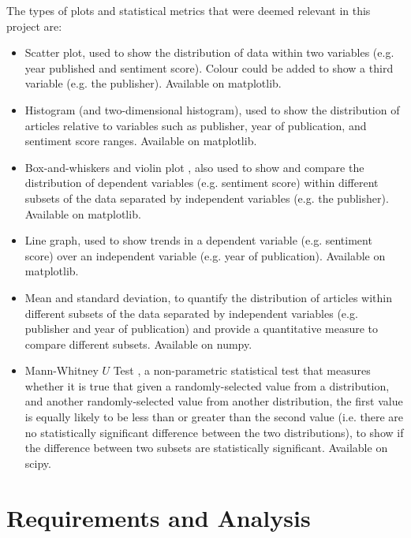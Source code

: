 \documentclass{report}
\begin{document}
The types of plots and statistical metrics that were deemed relevant in this project are:
\begin{itemize}
	\item Scatter plot, used to show the distribution of data within two variables (e.g. year published and sentiment score). 
		Colour could be added to show a third variable (e.g. the publisher).
		Available on matplotlib.
	\item Histogram (and two-dimensional histogram), used to show the distribution of articles relative to variables such as publisher, year of publication, and sentiment score ranges. 
		Available on matplotlib.
	\item Box-and-whiskers \cite{tukey1977exploratory} and violin plot \cite{hintze1998violin}, also used to show and compare the distribution of dependent variables (e.g. sentiment score) within different subsets of the data separated by independent variables (e.g. the publisher).
		Available on matplotlib.
	\item Line graph, used to show trends in a dependent variable (e.g. sentiment score) over an independent variable (e.g. year of publication).
		Available on matplotlib.
	\item Mean and standard deviation, to quantify the distribution of articles within different subsets of the data separated by independent variables (e.g. publisher and year of publication) and provide a quantitative measure to compare different subsets.
		Available on numpy.
	\item Mann-Whitney $U$ Test \cite{mann1947test}, a non-parametric statistical test that measures whether it is true that given a randomly-selected value from a distribution, and another randomly-selected value from another distribution, the first value is equally likely to be less than or greater than the second value (i.e. there are no statistically significant difference between the two distributions), to show if the difference between two subsets are statistically significant.
		Available on scipy.
\end{itemize}

\chapter{Requirements and Analysis} \label{Requirements and Analysis}  %

\end{document}
